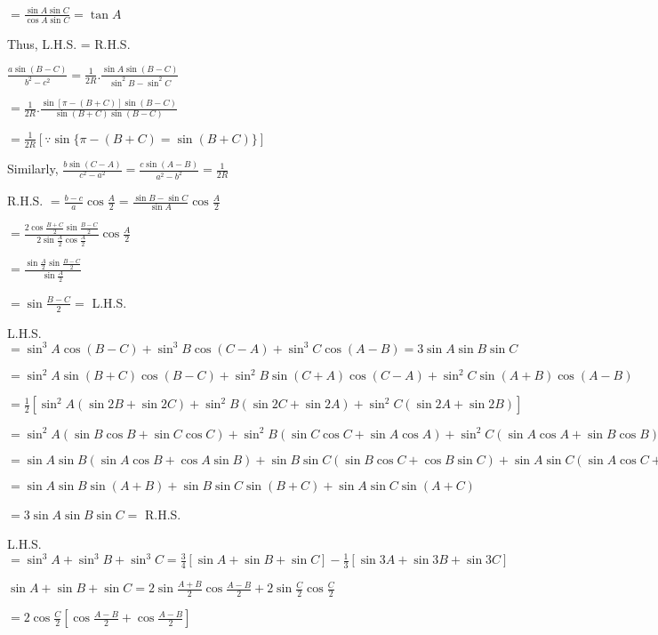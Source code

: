  $= \frac{\sin A\sin C}{\cos A\sin C} = \tan A$

  Thus, L.H.S. = R.H.S.

\item $\frac{a\sin(B - C)}{b^2 - c^2} = \frac{1}{2R}.\frac{\sin A\sin(B - C)}{\sin^2B - \sin^2C}$

  $= \frac{1}{2R}.\frac{\sin[\pi - (B + C)]\sin(B - C)}{\sin(B + C)\sin(B - C)}$

  $= \frac{1}{2R}[\because \sin\{\pi - (B + C) = \sin(B + C)\}]$

  Similarly, $\frac{b\sin(C - A)}{c^2 - a^2} = \frac{c\sin(A - B)}{a^2 - b^2} = \frac{1}{2R}$

\item R.H.S. $= \frac{b - c}{a}\cos\frac{A}{2} = \frac{\sin B - \sin C}{\sin A}\cos\frac{A}{2}$

  $= \frac{2\cos\frac{B + C}{2}\sin\frac{B - C}{2}}{2\sin\frac{A}{2}\cos\frac{A}{2}}\cos\frac{A}{2}$

  $= \frac{\sin\frac{A}{2}\sin\frac{B - C}{2}}{\sin\frac{A}{2}}$

  $= \sin\frac{B - C}{2} =$ L.H.S.

\item L.H.S. $= \sin^3A\cos(B - C) + \sin^3B\cos(C - A) + \sin^3C\cos(A - B) = 3\sin A\sin B\sin C$

  $= \sin^2A\sin(B + C)\cos(B - C) + \sin^2B\sin(C + A)\cos(C - A) + \sin^2C\sin(A + B)\cos(A - B)$

  $= \frac{1}{2}[\sin^2A(\sin 2B + \sin 2C) + \sin^2B(\sin 2C + \sin 2A) + \sin^2C(\sin2A + \sin 2B)]$

  $= \sin^2A(\sin B\cos B + \sin C\cos C) + \sin^2B(\sin C\cos C + \sin A\cos A) + \sin^2C(\sin A\cos A + \sin B\cos B)$

  $= \sin A\sin B(\sin A\cos B + \cos A\sin B) + \sin B\sin C(\sin B\cos C + \cos B\sin C) + \sin A\sin C(\sin A\cos C +
  \cos A\sin C)$

  $= \sin A\sin B\sin(A + B) + \sin B\sin C\sin(B + C) + \sin A\sin C\sin(A + C)$

  $= 3\sin A\sin B\sin C =$ R.H.S.

\item L.H.S. $= \sin^3A + \sin^3B + \sin^3C = \frac{3}{4}[\sin A + \sin B + \sin C] - \frac{1}{3}[\sin 3A + \sin 3B + \sin
  3C]$

  $\sin A + \sin B + \sin C = 2\sin\frac{A + B}{2}\cos\frac{A - B}{2} + 2\sin \frac{C}{2}\cos \frac{C}{2}$

  $= 2\cos\frac{C}{2}\left[\cos\frac{A - B}{2} + \cos\frac{A - B}{2}\right]$

